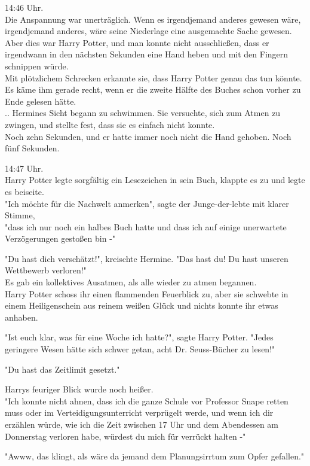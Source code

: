 {14:46 Uhr.\\ Die Anspannung war unerträglich. Wenn es irgendjemand anderes gewesen wäre, irgendjemand anderes, wäre seine Niederlage eine ausgemachte Sache gewesen.\\ Aber dies war Harry Potter, und man konnte nicht ausschließen, dass er irgendwann in den nächsten Sekunden eine Hand heben und mit den Fingern schnippen würde.\\ Mit plötzlichem Schrecken erkannte sie, dass Harry Potter genau das tun könnte. Es käme ihm gerade recht, wenn er die zweite Hälfte des Buches schon vorher zu Ende gelesen hätte.\\ .. Hermines Sicht begann zu schwimmen. Sie versuchte, sich zum Atmen zu zwingen, und stellte fest, dass sie es einfach nicht konnte.\\ Noch zehn Sekunden, und er hatte immer noch nicht die Hand gehoben. Noch fünf Sekunden.

14:47 Uhr.\\ Harry Potter legte sorgfältig ein Lesezeichen in sein Buch, klappte es zu und legte es beiseite.\\ "Ich möchte für die Nachwelt anmerken", sagte der Junge-der-lebte mit klarer Stimme,\\ "dass ich nur noch ein halbes Buch hatte und dass ich auf einige unerwartete Verzögerungen gestoßen bin -"

"Du hast dich verschätzt!", kreischte Hermine. "Das hast du! Du hast unseren Wettbewerb verloren!"\\ Es gab ein kollektives Ausatmen, als alle wieder zu atmen begannen.\\ Harry Potter schoss ihr einen flammenden Feuerblick zu, aber sie schwebte in einem Heiligenschein aus reinem weißen Glück und nichts konnte ihr etwas anhaben.

"Ist euch klar, was für eine Woche ich hatte?", sagte Harry Potter. "Jedes geringere Wesen hätte sich schwer getan, acht Dr. Seuss-Bücher zu lesen!"

"Du hast das Zeitlimit gesetzt."

Harrys feuriger Blick wurde noch heißer.\\ "Ich konnte nicht ahnen, dass ich die ganze Schule vor Professor Snape retten muss oder im Verteidigungsunterricht verprügelt werde, und wenn ich dir erzählen würde, wie ich die Zeit zwischen 17 Uhr und dem Abendessen am Donnerstag verloren habe, würdest du mich für verrückt halten -"

"Awww, das klingt, als wäre da jemand dem Planungsirrtum zum Opfer gefallen."

}
